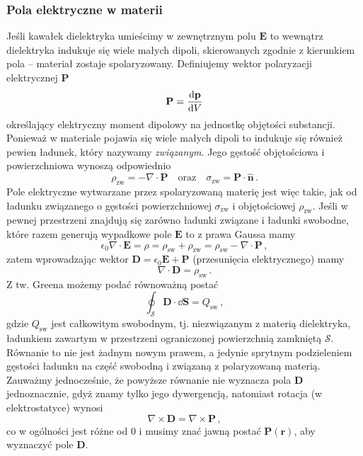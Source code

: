 \documentclass[../main.tex]{subfiles}
\begin{document}
\subsubsection{Pola elektryczne w materii}
Jeśli kawałek dielektryka umieścimy w zewnętrznym polu \(\mathbf{E}\) to wewnątrz dielektryka indukuje się wiele małych dipoli, skierowanych zgodnie z kierunkiem pola -- materiał zostaje spolaryzowany. Definiujemy wektor polaryzacji  elektrycznej \(\mathbf{P}\)
\begin{equation*}
    \mathbf{P}=\dv{\mathbf{p}}{V}
\end{equation*}
określający elektryczny moment dipolowy na jednostkę objętości substancji. Ponieważ w materiale pojawia się wiele małych dipoli to indukuje się również pewien ładunek, który nazywamy \textit{związanym}. Jego gęstość objętościowa i powierzchniowa wynoszą odpowiednio
\begin{equation*}
    \rho_\text{zw}=-\nabla\cdot\mathbf{P}\quad\text{oraz}\quad \sigma_\text{zw}=\mathbf{P}\cdot\mathbf{\hat{n}}\,.
\end{equation*}
Pole elektryczne wytwarzane przez spolaryzowaną materię jest więc takie, jak od ładunku związanego o gęstości powierzchniowej \(\sigma_\text{zw}\) i objętościowej \(\rho_\text{zw}\). Jeśli w pewnej przestrzeni znajdują się zarówno ładunki związane i ładunki swobodne, które razem generują wypadkowe pole \(\mathbf{E}\) to z prawa Gaussa mamy
\begin{equation*}
    \epsilon_0\nabla\cdot\mathbf{E}=\rho=\rho_\text{sw}+\rho_\text{zw}=\rho_\text{sw}-\nabla\cdot\mathbf{P}\,,
\end{equation*}
zatem wprowadzając wektor \(\mathbf{D}=\epsilon_0\mathbf{E}+\mathbf{P}\) (przesunięcia elektrycznego) mamy
\begin{equation*}
    \nabla\cdot\mathbf{D}=\rho_\text{sw}\,.
\end{equation*}
Z tw. Greena możemy podać równoważną postać
\begin{equation*}
    \oint_\mathcal{S}\mathbf{D}\cdot\dd{\mathbf{S}}=Q_\text{sw}\,,
\end{equation*}
gdzie \(Q_\text{sw}\) jest całkowitym swobodnym, tj. niezwiązanym z materią dielektryka, ładunkiem zawartym w przestrzeni ograniczonej powierzchnią zamkniętą \(\mathcal{S}\). Równanie to nie jest żadnym nowym prawem, a jedynie sprytnym podzieleniem gęstości ładunku na część swobodną i związaną z polaryzowaną materią. Zauważmy jednocześnie, że powyższe równanie nie wyznacza pola \(\mathbf{D}\) jednoznacznie, gdyż znamy tylko jego dywergencją, natomiast rotacja (w elektrostatyce) wynosi
\begin{equation*}
    \nabla\times\mathbf{D}=\nabla\times\mathbf{P}\,,
\end{equation*}
co w ogólności jest różne od 0 i musimy znać jawną postać \(\mathbf{P}(\mathbf{r})\), aby wyznaczyć pole \(\mathbf{D}\).
\end{document}
